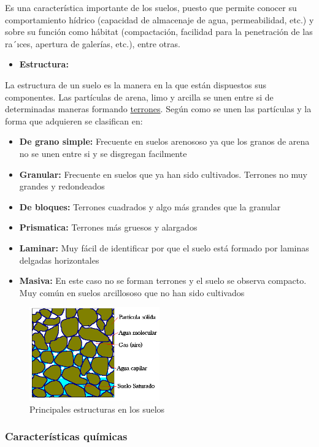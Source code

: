 \documentclass[a4paper,12pt,oneside]{article}
\begin{document}
 Es una característica importante de los suelos, puesto que permite conocer su
comportamiento hídrico (capacidad de almacenaje de agua, permeabilidad, etc.) y
sobre su función como hábitat (compactación, facilidad para la penetración de
las ra´ıces, apertura de galerías, etc.), entre otras.
\begin{itemize}
\item \textbf{Estructura:}
\end{itemize}
La estructura de un suelo es la manera en la que están dispuestos sus
componentes. Las partículas de arena, limo y arcilla se unen entre si de
determinadas maneras formando \uline{terrones}. Según como se unen las partículas y la
forma que adquieren se clasifican en:
\begin{itemize}
\item \textbf{De grano simple:} Frecuente en suelos arenososo ya que los granos
de arena no se unen entre si y se disgregan facilmente
\item \textbf{Granular:} Frecuente en suelos que ya han sido cultivados. Terrones no muy
grandes y redondeados
\item \textbf{De bloques:} Terrones cuadrados y algo más grandes que la granular
\item \textbf{Prismatica:} Terrones más gruesos y alargados
\item \textbf{Laminar:} Muy fácil de identificar por que el suelo está formado por laminas
delgadas horizontales
\item \textbf{Masiva:} En este caso no se forman terrones y el suelo se observa
compacto. Muy común en suelos arcillososo que no han sido cultivados
\end{itemize}
\begin{center}
\begin{figure}[htbp]
\centering
\includegraphics[width=0.5\textwidth]{./img_uf1596/porosidad.PNG}
\caption{Principales estructuras en los suelos}
\end{figure}
\end{center}
\subsubsection{Características químicas}
\label{sec:orgfad44f0}
\end{document}
